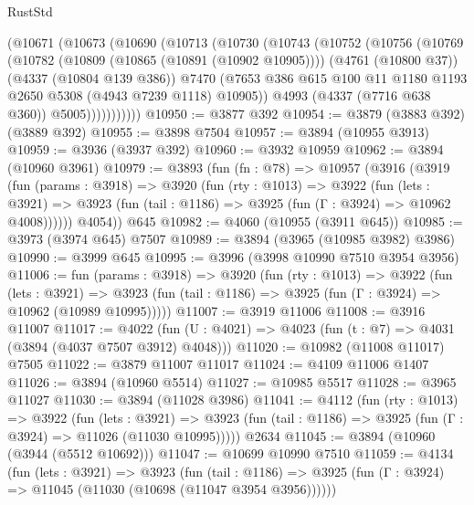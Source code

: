 \begin{lexlean}{RustStd}
\begin{coremodule}
        (@10671
          (@10673
            (@10690
              (@10713
                (@10730
                  (@10743
                    (@10752
                      (@10756
                        (@10769
                          (@10782
                            (@10809 (@10865 (@10891 (@10902 @10905))))
                            (@4761 (@10800 @37))
                            (@4337 (@10804 @139 @386))
                            @7470
                            (@7653
                              @386
                              @615
                              @100
                              @11
                              @1180
                              @1193
                              @2650
                              @5308
                              (@4943 @7239 @1118)
                              @10905))
                          @4993
                          (@4337 (@7716 @638 @360))
                          @5005)))))))))))
@10950 := @3877 @392
@10954 := @3879 (@3883 @392) (@3889 @392)
@10955 := @3898 @7504
@10957 := @3894 (@10955 @3913)
@10959 := @3936 (@3937 @392)
@10960 := @3932 @10959
@10962 := @3894 (@10960 @3961)
@10979 := @3893
    (fun (fn : @78) =>
    @10957
      (@3916
        (@3919
          (fun (params : @3918) =>
          @3920
            (fun (rty : @1013) =>
            @3922
              (fun (lets : @3921) =>
              @3923 (fun (tail : @1186) => @3925 (fun (Γ : @3924) => @10962 @4008))))))
        @4054))
    @645
@10982 := @4060 (@10955 (@3911 @645))
@10985 := @3973 (@3974 @645) @7507
@10989 := @3894 (@3965 (@10985 @3982) @3986)
@10990 := @3999 @645
@10995 := @3996 (@3998 @10990 @7510 @3954 @3956)
@11006 := fun (params : @3918) =>
  @3920
    (fun (rty : @1013) =>
    @3922
      (fun (lets : @3921) =>
      @3923 (fun (tail : @1186) => @3925 (fun (Γ : @3924) => @10962 (@10989 @10995)))))
@11007 := @3919 @11006
@11008 := @3916 @11007
@11017 := @4022 (fun (U : @4021) => @4023 (fun (t : @7) => @4031 (@3894 (@4037 @7507 @3912) @4048)))
@11020 := @10982 (@11008 @11017) @7505
@11022 := @3879 @11007 @11017
@11024 := @4109 @11006 @1407
@11026 := @3894 (@10960 @5514)
@11027 := @10985 @5517
@11028 := @3965 @11027
@11030 := @3894 (@11028 @3986)
@11041 := @4112
    (fun (rty : @1013) =>
    @3922
      (fun (lets : @3921) =>
      @3923 (fun (tail : @1186) => @3925 (fun (Γ : @3924) => @11026 (@11030 @10995)))))
    @2634
@11045 := @3894 (@10960 (@3944 (@5512 @10692)))
@11047 := @10699 @10990 @7510
@11059 := @4134
    (fun (lets : @3921) =>
    @3923
      (fun (tail : @1186) =>
      @3925 (fun (Γ : @3924) => @11045 (@11030 (@10698 (@11047 @3954 @3956))))))

\end{coremodule}
\end{lexlean}
